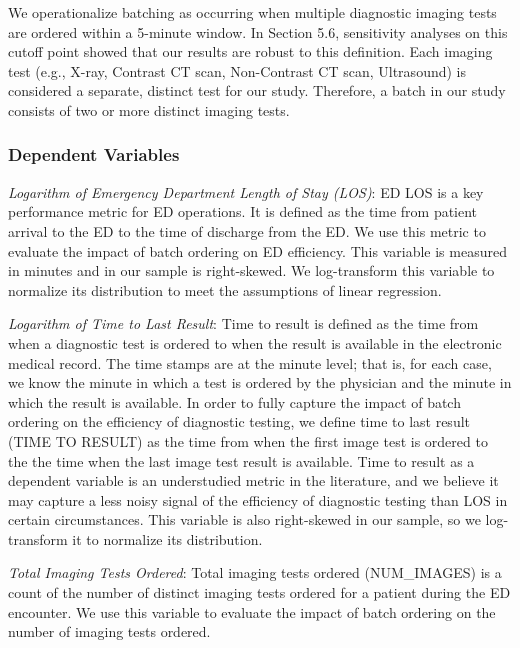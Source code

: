 \documentclass[,mnsc,nonblindrev]{informs}
\begin{document}
We operationalize batching as occurring when multiple diagnostic imaging
tests are ordered within a 5-minute window. In Section 5.6, sensitivity
analyses on this cutoff point showed that our results are robust to this
definition. Each imaging test (e.g., X-ray, Contrast CT scan,
Non-Contrast CT scan, Ultrasound) is considered a separate, distinct
test for our study. Therefore, a batch in our study consists of two or
more distinct imaging tests.

\hypertarget{dependent-variables}{%
\subsubsection{Dependent Variables}\label{dependent-variables}}

\hfill\break
\textit{Logarithm of Emergency Department Length of Stay (LOS)}: ED LOS
is a key performance metric for ED operations. It is defined as the time
from patient arrival to the ED to the time of discharge from the ED. We
use this metric to evaluate the impact of batch ordering on ED
efficiency. This variable is measured in minutes and in our sample is
right-skewed. We log-transform this variable to normalize its
distribution to meet the assumptions of linear regression.

\textit{Logarithm of Time to Last Result}: Time to result is defined as
the time from when a diagnostic test is ordered to when the result is
available in the electronic medical record. The time stamps are at the
minute level; that is, for each case, we know the minute in which a test
is ordered by the physician and the minute in which the result is
available. In order to fully capture the impact of batch ordering on the
efficiency of diagnostic testing, we define time to last result (TIME TO
RESULT) as the time from when the first image test is ordered to the the
time when the last image test result is available. Time to result as a
dependent variable is an understudied metric in the literature, and we
believe it may capture a less noisy signal of the efficiency of
diagnostic testing than LOS in certain circumstances. This variable is
also right-skewed in our sample, so we log-transform it to normalize its
distribution.

\textit{Total Imaging Tests Ordered}: Total imaging tests ordered
(NUM\_IMAGES) is a count of the number of distinct imaging tests ordered
for a patient during the ED encounter. We use this variable to evaluate
the impact of batch ordering on the number of imaging tests ordered.
\end{document}
